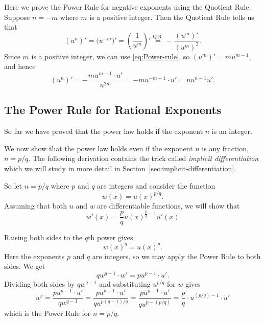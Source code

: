 Here we prove the Power Rule for negative exponents using the Quotient
Rule.  Suppose $n=-m$ where $m$ is a positive integer.   Then the Quotient
Rule tells us that
\[
(u^n)'
=\bigl(u^{-m}\bigr)'
=\left(\frac{1}{u^m}\right)'
\stackrel{\text{Q.R.}}{=}
-\frac{(u^m)'}{(u^m)^2}.
\]
Since $m$ is a positive integer, we can use \eqref{eq:Power-rule}, so
$(u^m)' = mu^{m-1}$, and hence
\[
(u^n)'
= -\frac{mu^{m-1}\cdot u'}{u^{2m}}
=-mu^{-m-1}\cdot u'
= n u^{n-1}u'.
\]








\subsection{The Power Rule for Rational Exponents} 
So far we have proved that the power law holds if the exponent $n$ is an
integer.




We now show that the power law holds even if the exponent $n$ is any
fraction, $n=p/q$.  The following derivation contains the trick called
\emph{implicit differentiation} which we will study in more detail in
Section~\ref{sec:implicit-differentiation}.




So let $n=p/q$ where $p$ and $q$ are integers and consider the function
\[
w(x)=u(x)^{p/q}.
\]
Assuming that both $u$ and $w$ are differentiable functions, we will show that
\begin{equation}\label{eq:power-rule-rational-exponents}
  w'(x) = \frac pq u(x)^{\frac pq-1}u'(x)
\end{equation}








Raising both sides to the $q$th power gives
\[
w(x)^q=u(x)^p.
\]
Here the exponents $p$ and $q$ are integers, so we may apply the Power Rule
to both sides.  We get
\[
qw^{q-1}\cdot w'=pu^{p-1}\cdot u'.
\]
Dividing both sides by $qw^{q-1}$ and substituting $u^{p/q}$ for $w$ gives
\[
w'= \frac{pu^{p-1}\cdot u'}{qw^{q-1}}=
\frac{pu^{p-1}\cdot u'}{qu^{p(q-1)/q}}=
\frac{pu^{p-1}\cdot u'}{qu^{p-(p/q)}}=
\frac{p}{q}\cdot u^{(p/q)-1}\cdot u'
\]
which is the Power Rule for $n=p/q$.


